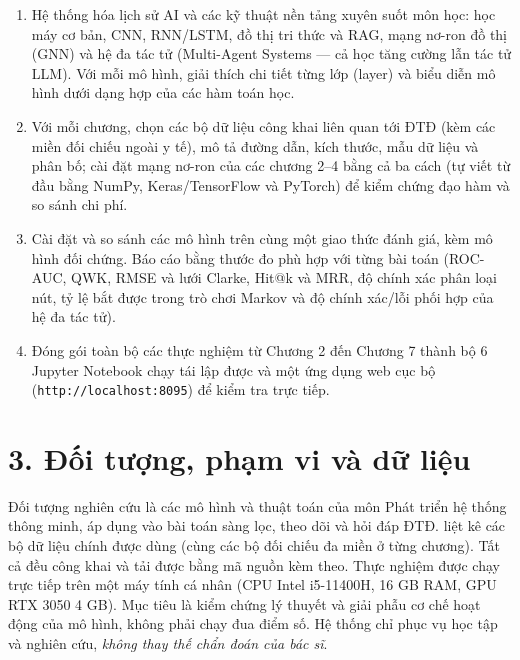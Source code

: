 \begin{enumerate}
  \item Hệ thống hóa lịch sử AI và các kỹ thuật nền tảng xuyên suốt môn học: học máy cơ bản, CNN, RNN/LSTM, đồ thị tri thức và RAG, mạng nơ-ron đồ thị (GNN) và hệ đa tác tử (Multi-Agent Systems — cả học tăng cường lẫn tác tử LLM). Với mỗi mô hình, giải thích chi tiết từng lớp (layer) và biểu diễn mô hình dưới dạng hợp của các hàm toán học.
  \item Với mỗi chương, chọn các bộ dữ liệu công khai liên quan tới ĐTĐ (kèm các miền đối chiếu ngoài y tế), mô tả đường dẫn, kích thước, mẫu dữ liệu và phân bố; cài đặt mạng nơ-ron của các chương 2–4 bằng cả ba cách (tự viết từ đầu bằng NumPy, Keras/TensorFlow và PyTorch) để kiểm chứng đạo hàm và so sánh chi phí.
  \item Cài đặt và so sánh các mô hình trên cùng một giao thức đánh giá, kèm mô hình đối chứng. Báo cáo bằng thước đo phù hợp với từng bài toán (ROC-AUC, QWK, RMSE và lưới Clarke, Hit@k và MRR, độ chính xác phân loại nút, tỷ lệ bắt được trong trò chơi Markov và độ chính xác/lỗi phối hợp của hệ đa tác tử).
  \item Đóng gói toàn bộ các thực nghiệm từ Chương 2 đến Chương 7 thành bộ 6 Jupyter Notebook chạy tái lập được và một ứng dụng web cục bộ (\texttt{http://localhost:8095}) để kiểm tra trực tiếp.
\end{enumerate}

\section*{3. Đối tượng, phạm vi và dữ liệu}

Đối tượng nghiên cứu là các mô hình và thuật toán của môn Phát triển hệ thống thông minh, áp dụng vào bài toán sàng lọc, theo dõi và hỏi đáp ĐTĐ.  liệt kê các bộ dữ liệu chính được dùng (cùng các bộ đối chiếu đa miền ở từng chương). Tất cả đều công khai và tải được bằng mã nguồn kèm theo. Thực nghiệm được chạy trực tiếp trên một máy tính cá nhân (CPU Intel i5-11400H, 16 GB RAM, GPU RTX 3050 4 GB). Mục tiêu là kiểm chứng lý thuyết và giải phẫu cơ chế hoạt động của mô hình, không phải chạy đua điểm số. Hệ thống chỉ phục vụ học tập và nghiên cứu, \emph{không thay thế chẩn đoán của bác sĩ}.

